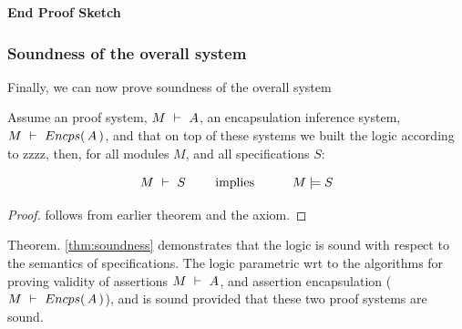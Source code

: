 \noindent
\vspace{.1cm}
  {\textbf{End Proof Sketch}} 

\vspace{1cm}

  \subsubsection{Soundness of the overall system}
Finally, we can now prove soundness of the overall system

\begin{theorem}[Soundness]
\label{thm:soundness}
Assume an \SpecO proof system, $M\ \vdash\ A$, 
an encapsulation inference system, $M\ \vdash\ {Encps(\, A\, )}$,
 and  that on top of these systems we built
 the \SpecLang logic according to zzzz,  then, for    all modules $M$, and all \SpecLang specifications  $S$:
 
 $$\proves{M}{S}\ \ \ \ \ \ \ \mbox{implies}\ \ \ \ \ \  \ \ \ \satisfies{M}{S}$$
\end{theorem}

\begin{proof}
follows from earlier theorem and the axiom.
\end{proof}
 


Theorem. \ref{thm:soundness} demonstrates 
 that the   \SpecLang logic is sound with respect to the semantics of \SpecLang specifications.
 The \SpecLang logic parametric wrt to the algorithms for proving validity of assertions
 $M\ \vdash\ A$, and 
 assertion encapsulation ($M\ \vdash\ {Encps(\, A\, )}$), and is sound
 provided that these two proof systems are sound.


